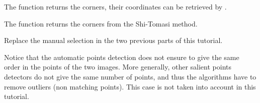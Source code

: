 \begin{mcomment}
\begin{mremark}
The function  returns the corners, their coordinates can be retrieved by .
\end{mremark}
\end{mcomment}
\begin{pcomment}
\begin{premark}
The function  returns the corners from the Shi-Tomasi method.
\end{premark}
\end{pcomment}

\begin{qbox}
Replace the manual selection in the two previous parts of this tutorial.
\end{qbox}

Notice that the automatic points detection does not ensure to give the same order in the points of the two images. More generally, other salient points detectors do not give the same number of points, and thus the algorithms have to remove outliers (non matching points). This case is not taken into account in this tutorial.


